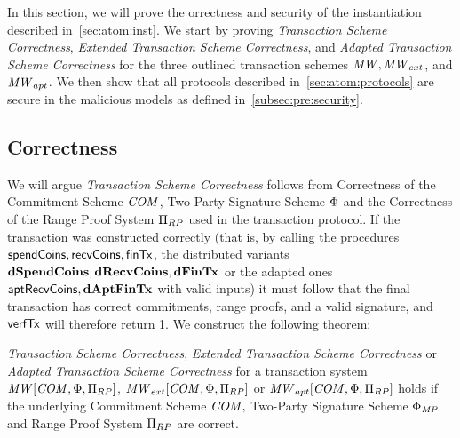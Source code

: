 In this section, we will prove the orrectness and security of the instantiation described in~\cref{sec:atom:inst}.
We start by proving \emph{Transaction Scheme Correctness}, \emph{Extended Transaction Scheme Correctness}, and \emph{Adapted Transaction Scheme Correctness} for the three outlined transaction schemes $\mathit{MW}, \mathit{MW}_{ext}$, and $\mathit{MW}_{apt}$.
We then show that all protocols described in~\cref{sec:atom:protocols} are secure in the malicious models as defined in~\cref{subsec:pre:security}.

\subsection{Correctness} \label{subsec:atom:correctness}

We will argue \emph{Transaction Scheme Correctness} follows from Correctness of the Commitment Scheme $\mathit{COM}$, Two-Party Signature Scheme $\Phi$ and the Correctness of the Range Proof System $\Pi_{RP}$ used in the transaction protocol.
If the transaction was constructed correctly (that is, by calling the procedures $\mathsf{spendCoins}, \mathsf{recvCoins}, \mathsf{finTx}$, the distributed variants $\mathbf{dSpendCoins}, \mathbf{dRecvCoins}, \mathbf{dFinTx}$ or the adapted ones $\mathsf{aptRecvCoins}, \mathbf{dAptFinTx}$ with valid inputs) it must follow that the final transaction has correct commitments, range proofs, and a valid signature, and $\mathsf{verfTx}$ will therefore return 1.
We construct the following theorem:

\begin{theorem}
    \label{lem:atom:correctness}
    \emph{Transaction Scheme Correctness}, \emph{Extended Transaction Scheme Correctness} or \emph{Adapted Transaction Scheme Correctness} for a transaction system $\mathit{MW}[\mathit{COM},\Phi,\Pi_{RP}]$, $\mathit{MW}_{ext}[\mathit{COM},\Phi,\Pi_{RP}]$ or $\mathit{MW}_{apt}[\mathit{COM},\Phi,\Pi_{RP}]$ holds if the underlying Commitment Scheme $\mathit{COM},$ Two-Party Signature Scheme $\Phi_{\mathit{MP}}$ and Range Proof System $\Pi_{RP}$ are correct.
\end{theorem}

